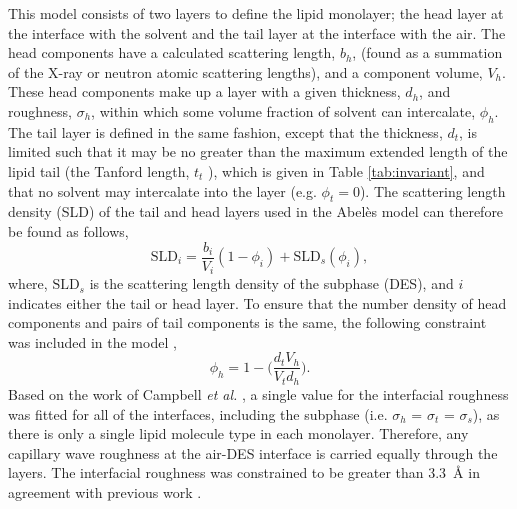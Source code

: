 \documentclass[amsmath,amssymb,twocolumn,superscriptaddress]{revtex4-1}
\begin{document}
This model consists of two layers to define the lipid monolayer; the head layer at the interface with the solvent and the tail layer at the interface with the air.
The head components have a calculated scattering length, $b_h$, (found as a summation of the X-ray or neutron atomic scattering lengths), and a component volume, $V_h$.
These head components make up a layer with a given thickness, $d_h$, and roughness, $\sigma_h$, within which some volume fraction of solvent can intercalate, $\phi_h$.
The tail layer is defined in the same fashion, except that the thickness, $d_t$, is limited such that it may be no greater than the maximum extended length of the lipid tail (the Tanford length, $t_t$ \cite{tanford_hydrophobic_1980}), which is given in Table \ref{tab:invariant}, and that no solvent may intercalate into the layer (e.g. $\phi_t = 0$).
The scattering length density (SLD) of the tail and head layers used in the Abel\`{e}s model can therefore be found as follows,
%
\begin{equation}
\text{SLD}_i = \frac{b_i}{V_i}(1 - \phi_i) + \text{SLD}_{s}(\phi_i),
\end{equation}
%
where, $\text{SLD}_{s}$ is the scattering length density of the subphase (DES), and $i$ indicates either the tail or head layer.
To ensure that the number density of head components and pairs of tail components is the same, the following constraint was included in the model \cite{braun_polymers_2017},
%
\begin{equation}
\label{equ:phih}
\phi_h =  1 - \bigg(\frac{d_tV_h}{V_td_h}\bigg).
\end{equation}
%
Based on the work of Campbell \emph{et al.} \cite{campbell_structure_2018}, a single value for the interfacial roughness was fitted for all of the interfaces, including the subphase (i.e. $\sigma_h$ = $\sigma_t$ = $\sigma_s$), as there is only a single lipid molecule type in each monolayer.
Therefore, any capillary wave roughness at the air-DES interface is carried equally through the layers.
The interfacial roughness was constrained to be greater than \SI{3.3}{\angstrom} in agreement with previous work \cite{sanchez-fernandez_micellization_2016}.
%
\end{document}
